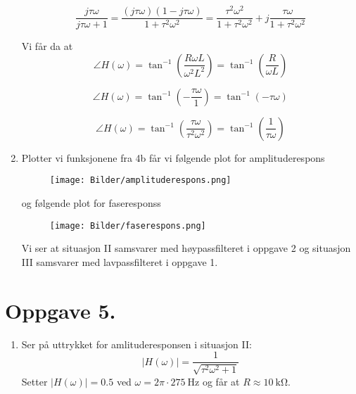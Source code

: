 \documentclass[a4paper,11pt,norsk]{article}
\begin{document}
\begin{enumerate}
        \begin{equation}
            \frac{j\tau\omega}{j\tau\omega + 1} = \frac{(j\tau\omega)(1-j\tau\omega)}{1 + \tau^2\omega^2} = \frac{\tau^2\omega^2}{1 + \tau^2\omega^2} + j\frac{\tau\omega}{1 + \tau^2\omega^2} 
        \end{equation}

        \setcounter{equation}{0} 
        Vi får da at 
        \begin{equation}
            \angle H(\omega) = \tan^{-1}{\left(\frac{R \omega L}{\omega^2L^2}\right)} = \tan^{-1}{\left(\frac{R}{\omega L}\right)}
        \end{equation}

        \begin{equation}
            \angle H(\omega) = \tan^{-1}{\left(-\frac{\tau\omega}{1}\right)} = \tan^{-1}{(-\tau\omega)}
        \end{equation}

        \begin{equation}
            \angle H(\omega) = \tan^{-1}{\left(\frac{\tau\omega}{\tau^2\omega^2}\right)} = \tan^{-1}{\left(\frac{1}{\tau\omega}\right)}
        \end{equation}
    \item Plotter vi funksjonene fra 4b får vi følgende plot for amplituderespons
        \begin{figure}[H]
            \centering
            \texttt{[image: Bilder/amplituderespons.png]}
        \end{figure}
        og følgende plot for faseresponss
        \begin{figure}[H]
            \centering
            \texttt{[image: Bilder/faserespons.png]}
        \end{figure}

        Vi ser at situasjon II samsvarer med høypassfilteret i oppgave 2 og situasjon III samsvarer med lavpassfilteret i
        oppgave 1.
\end{enumerate}


\section*{Oppgave 5.}
\begin{enumerate}
    \item Ser på uttrykket for amlituderesponsen i situasjon II:
        \[
            |H(\omega)| = \frac{1}{\sqrt{\tau^2\omega^2 + 1}}
        \]
        Setter $|H(\omega)| = 0.5$ ved $\omega = 2\pi \cdot \SI{275}{\hertz}$ og får at 
        $R \approx \SI{10}{\kilo\ohm}$.
\end{enumerate}
\end{document}
